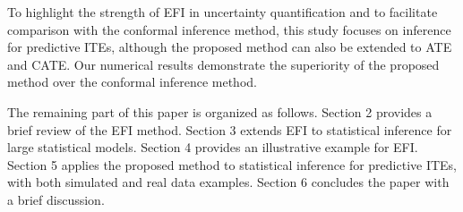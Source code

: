 \documentclass[11pt]{article}
\begin{document}
To highlight the strength of EFI in uncertainty quantification and to facilitate comparison with the conformal inference method, this study focuses on inference for predictive ITEs, although the proposed method can also be extended to ATE and CATE. Our numerical results demonstrate the superiority of the proposed method over the conformal inference method.

The remaining part of this paper is organized as follows. Section 2 provides a brief review
of the EFI method. Section 3 extends EFI to statistical inference for large statistical models.  Section 4 provides an illustrative example for EFI. 
Section 5 applies the proposed method to 
statistical inference for predictive ITEs, with both simulated and real data examples. Section 6 concludes the paper with a brief discussion. 





\end{document}
